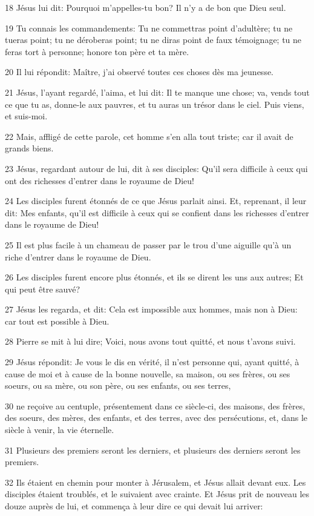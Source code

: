 \par 18 Jésus lui dit: Pourquoi m'appelles-tu bon? Il n'y a de bon que Dieu seul.
\par 19 Tu connais les commandements: Tu ne commettras point d'adultère; tu ne tueras point; tu ne déroberas point; tu ne diras point de faux témoignage; tu ne feras tort à personne; honore ton père et ta mère.
\par 20 Il lui répondit: Maître, j'ai observé toutes ces choses dès ma jeunesse.
\par 21 Jésus, l'ayant regardé, l'aima, et lui dit: Il te manque une chose; va, vends tout ce que tu as, donne-le aux pauvres, et tu auras un trésor dans le ciel. Puis viens, et suis-moi.
\par 22 Mais, affligé de cette parole, cet homme s'en alla tout triste; car il avait de grands biens.
\par 23 Jésus, regardant autour de lui, dit à ses disciples: Qu'il sera difficile à ceux qui ont des richesses d'entrer dans le royaume de Dieu!
\par 24 Les disciples furent étonnés de ce que Jésus parlait ainsi. Et, reprenant, il leur dit: Mes enfants, qu'il est difficile à ceux qui se confient dans les richesses d'entrer dans le royaume de Dieu!
\par 25 Il est plus facile à un chameau de passer par le trou d'une aiguille qu'à un riche d'entrer dans le royaume de Dieu.
\par 26 Les disciples furent encore plus étonnés, et ils se dirent les uns aux autres; Et qui peut être sauvé?
\par 27 Jésus les regarda, et dit: Cela est impossible aux hommes, mais non à Dieu: car tout est possible à Dieu.
\par 28 Pierre se mit à lui dire; Voici, nous avons tout quitté, et nous t'avons suivi.
\par 29 Jésus répondit: Je vous le dis en vérité, il n'est personne qui, ayant quitté, à cause de moi et à cause de la bonne nouvelle, sa maison, ou ses frères, ou ses soeurs, ou sa mère, ou son père, ou ses enfants, ou ses terres,
\par 30 ne reçoive au centuple, présentement dans ce siècle-ci, des maisons, des frères, des soeurs, des mères, des enfants, et des terres, avec des persécutions, et, dans le siècle à venir, la vie éternelle.
\par 31 Plusieurs des premiers seront les derniers, et plusieurs des derniers seront les premiers.
\par 32 Ils étaient en chemin pour monter à Jérusalem, et Jésus allait devant eux. Les disciples étaient troublés, et le suivaient avec crainte. Et Jésus prit de nouveau les douze auprès de lui, et commença à leur dire ce qui devait lui arriver:
